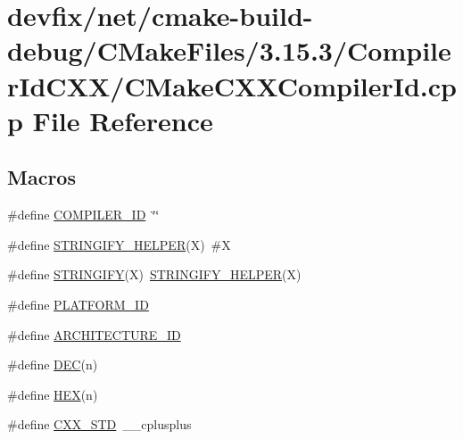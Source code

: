 \hypertarget{net_2cmake-build-debug_2CMakeFiles_23_815_83_2CompilerIdCXX_2CMakeCXXCompilerId_8cpp}{}\section{devfix/net/cmake-\/build-\/debug/\+C\+Make\+Files/3.15.3/\+Compiler\+Id\+C\+X\+X/\+C\+Make\+C\+X\+X\+Compiler\+Id.cpp File Reference}
\label{net_2cmake-build-debug_2CMakeFiles_23_815_83_2CompilerIdCXX_2CMakeCXXCompilerId_8cpp}
\subsection*{Macros}
\begin{DoxyCompactItemize}
\item 
\#define \hyperlink{net_2cmake-build-debug_2CMakeFiles_23_815_83_2CompilerIdCXX_2CMakeCXXCompilerId_8cpp_a81dee0709ded976b2e0319239f72d174}{C\+O\+M\+P\+I\+L\+E\+R\+\_\+\+ID}~\char`\"{}\char`\"{}
\item 
\#define \hyperlink{net_2cmake-build-debug_2CMakeFiles_23_815_83_2CompilerIdCXX_2CMakeCXXCompilerId_8cpp_a2ae9b72bb13abaabfcf2ee0ba7d3fa1d}{S\+T\+R\+I\+N\+G\+I\+F\+Y\+\_\+\+H\+E\+L\+P\+ER}(X)~\#X
\item 
\#define \hyperlink{net_2cmake-build-debug_2CMakeFiles_23_815_83_2CompilerIdCXX_2CMakeCXXCompilerId_8cpp_a43e1cad902b6477bec893cb6430bd6c8}{S\+T\+R\+I\+N\+G\+I\+FY}(X)~\hyperlink{net_2cmake-build-debug_2CMakeFiles_23_815_83_2CompilerIdCXX_2CMakeCXXCompilerId_8cpp_a2ae9b72bb13abaabfcf2ee0ba7d3fa1d}{S\+T\+R\+I\+N\+G\+I\+F\+Y\+\_\+\+H\+E\+L\+P\+ER}(X)
\item 
\#define \hyperlink{net_2cmake-build-debug_2CMakeFiles_23_815_83_2CompilerIdCXX_2CMakeCXXCompilerId_8cpp_adbc5372f40838899018fadbc89bd588b}{P\+L\+A\+T\+F\+O\+R\+M\+\_\+\+ID}
\item 
\#define \hyperlink{net_2cmake-build-debug_2CMakeFiles_23_815_83_2CompilerIdCXX_2CMakeCXXCompilerId_8cpp_aba35d0d200deaeb06aee95ca297acb28}{A\+R\+C\+H\+I\+T\+E\+C\+T\+U\+R\+E\+\_\+\+ID}
\item 
\#define \hyperlink{net_2cmake-build-debug_2CMakeFiles_23_815_83_2CompilerIdCXX_2CMakeCXXCompilerId_8cpp_ad1280362da42492bbc11aa78cbf776ad}{D\+EC}(n)
\item 
\#define \hyperlink{net_2cmake-build-debug_2CMakeFiles_23_815_83_2CompilerIdCXX_2CMakeCXXCompilerId_8cpp_a46d5d95daa1bef867bd0179594310ed5}{H\+EX}(n)
\item 
\#define \hyperlink{net_2cmake-build-debug_2CMakeFiles_23_815_83_2CompilerIdCXX_2CMakeCXXCompilerId_8cpp_a34cc889e576a1ae6c84ae9e0a851ba21}{C\+X\+X\+\_\+\+S\+TD}~\+\_\+\+\_\+cplusplus
\end{DoxyCompactItemize}

